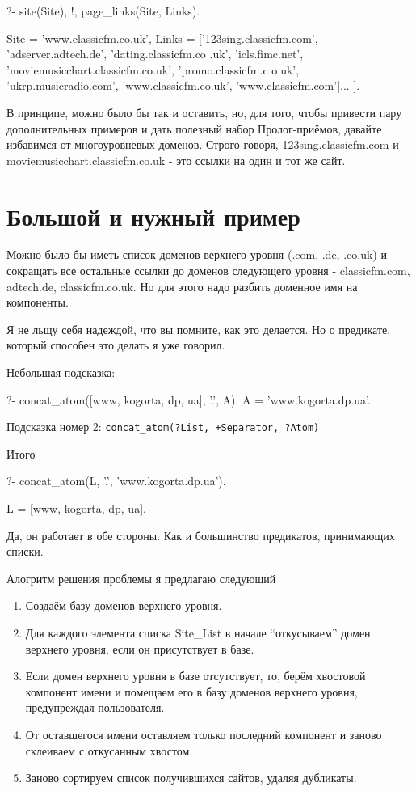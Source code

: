 \documentclass[a4paper]{book}
\begin{document}
\begin{example}{}{}
?- site(Site), !, page_links(Site, Links).

Site = 'www.classicfm.co.uk',
Links = ['123sing.classicfm.com', 'adserver.adtech.de', 'dating.classicfm.co
.uk', 'icls.fimc.net', 'moviemusicchart.classicfm.co.uk', 'promo.classicfm.c
o.uk', 'ukrp.musicradio.com', 'www.classicfm.co.uk', 'www.classicfm.com'|...
].                                                                         
\end{example}

В принципе, можно было бы так и оставить, но, для того, чтобы
привести пару дополнительных примеров и дать полезный набор
Пролог-приёмов, давайте избавимся от многоуровневых
доменов. Строго говоря, 123sing.classicfm.com и
moviemusicchart.classicfm.co.uk - это ссылки на один и тот же
сайт.

\section{Большой и нужный пример}

Можно было бы иметь список доменов верхнего уровня (.com, .de,
.co.uk) и сокращать все остальные ссылки до доменов следующего
уровня - classicfm.com, adtech.de, classicfm.co.uk. Но для этого
надо разбить доменное имя на компоненты.

Я не льщу себя надеждой, что вы помните, как это
делается. Но о предикате, который способен это делать я
уже говорил.

Небольшая подсказка:

\begin{example}{}{}
?- concat_atom([www, kogorta, dp, ua], '.', A).
A = 'www.kogorta.dp.ua'.
\end{example}

Подсказка номер 2: \verb|concat_atom(?List, +Separator, ?Atom)|

Итого

\begin{example}{}{}
?- concat_atom(L, '.', 'www.kogorta.dp.ua').

L = [www, kogorta, dp, ua].
\end{example}

Да, он работает в обе стороны. Как и большинство предикатов,
принимающих списки.

Алогритм решения проблемы я предлагаю следующий


\begin{enumerate}
\item Создаём базу доменов верхнего уровня.
\item Для каждого элемента списка Site_List в начале
  ``откусываем'' домен верхнего уровня, если он присутствует в
  базе.
\item Если домен верхнего уровня в базе отсутствует, то, берём
  хвостовой компонент имени и помещаем его в базу доменов
  верхнего уровня, предупреждая пользователя.
\item От оставшегося имени оставляем только последний компонент и
  заново склеиваем с откусанным хвостом.
\item Заново сортируем список получившихся сайтов, удаляя дубликаты.
\end{enumerate}
\end{document}
